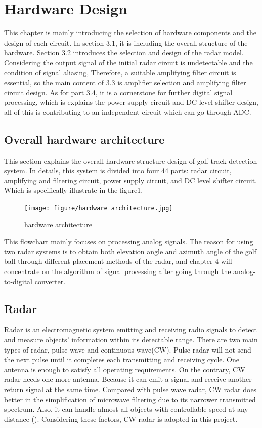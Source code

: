 \newpage
\section{Hardware Design}
This chapter is mainly introducing the selection of hardware components and the design of each circuit. In section 3.1, it is including the overall structure of the hardware. Section 3.2 introduces the selection and design of the radar model. Considering the output signal of the initial radar circuit is undetectable and the condition of signal aliasing, Therefore, a suitable amplifying filter circuit is essential, so the main content of 3.3 is amplifier selection and amplifying filter circuit design. As for part 3.4, it is a cornerstone for further digital signal processing, which is explains the power supply circuit and DC level shifter design, all of this is contributing to an independent circuit which can go through ADC.
\subsection{Overall hardware architecture}
This section explains the overall hardware structure design of golf track detection system. In details, this system is divided into four 
44
 parts: radar circuit, amplifying and filtering circuit, power supply circuit, and DC level shifter circuit. Which is specifically illustrate in the figure1.
\begin{figure}[H]
    \centering
    \texttt{[image: figure/hardware
    architecture.jpg]}
    \caption{hardware architecture}
\end{figure}
This flowchart mainly focuses on processing analog signals. The reason for using two radar systems is to obtain both elevation angle and azimuth angle of the golf ball through different placement methods of the radar, and chapter 4 will concentrate on the algorithm of signal processing after going through the analog-to-digital converter.
\subsection{Radar}
Radar is an electromagnetic system emitting and receiving radio signals to detect and measure objects’ information within its detectable range. There are two main types of radar, pulse wave and continuous-wave(CW). Pulse radar will not send the next pulse until it completes each transmitting and receiving cycle. One antenna is enough to satisfy all operating requirements. On the contrary, CW radar needs one more antenna. Because it can emit a signal and receive another return signal at the same time. Compared with pulse wave radar, CW radar does better in the simplification of microwave filtering due to its narrower transmitted spectrum. Also, it can handle almost all objects with controllable speed at any distance (\cite{skolnik1970radar}). Considering these factors, CW radar is adopted in this project. 


